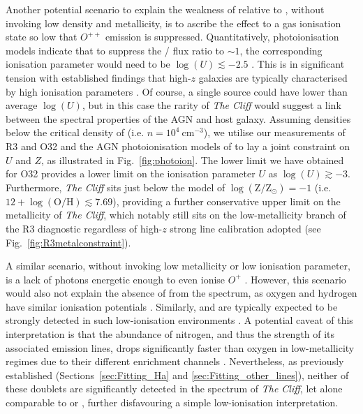 \documentclass[fleqn,usenatbib]{mnras}
\newcommand{\Hbeta}{\text{H\textbeta}\xspace}
\newcommand{\OIIall}{\forbiddenEL[O][ii][\textlambda][\textlambda][3727,][3729]}
\newcommand{\SIIall}{\forbiddenEL[S][ii][\textlambda][\textlambda][6716,][6731]}
\newcommand{\OIII}{\forbiddenEL[O][iii]}
\newcommand{\NIIall}{\forbiddenEL[N][ii][\textlambda][\textlambda][6548,][6583]}
\newcommand{\cliff}{\textit{The Cliff}\xspace}
\begin{document}
Another potential scenario to explain the weakness of \OIIIL relative to \Hbeta, without invoking low density and metallicity, is to ascribe the effect to a gas ionisation state so low that $O^{++}$ emission is suppressed. 
Quantitatively, photoionisation models indicate that to suppress the \OIII/\Hbeta flux ratio to $\sim1$, the corresponding ionisation parameter would need to be $\log(U)\lesssim-2.5$ \citep[e.g.][]{Nagao2006, BaronNetzer2019, Cameron2023}.
This is in significant tension with established findings that high-$z$ galaxies are typically characterised by high ionisation parameters \citep[$\log(U)\gtrsim -2.0$; e.g.][]{Cameron2023,Reddy2023, Tang2023}. 
Of course, a single source could have lower than average $\log(U)$, but in this case the rarity of \cliff would suggest a link between the spectral properties of the AGN and host galaxy.
Assuming densities below the critical density of \OIIall (i.e. $n = 10^4 \ \mathrm{cm}^{-3}$), we utilise our measurements of R3 and O32 and the AGN photoionisation models of \cite{Isobe2025} to lay a joint constraint on $U$ and $Z$, as illustrated in Fig.~\ref{fig:photoion}.
The lower limit we have obtained for O32 provides a lower limit on the ionisation parameter $U$ as $\log(U) \gtrsim -3$. 
Furthermore, \cliff sits just below the model of $\mathrm{\log(Z/Z_\odot)} = -1$ (i.e. $12+\log(\mathrm{O/H}) \lesssim 7.69$), providing a further conservative upper limit on the metallicity of \cliff, which notably still sits on the low-metallicity branch of the R3 diagnostic regardless of high-$z$ strong line calibration adopted (see Fig.~\ref{fig:R3metalconstraint}).

A similar scenario, without invoking low metallicity or low ionisation parameter, is a lack of photons energetic enough to even ionise $O^+$ \citep[$\sim35$ eV; see e.g.][]{Wenaker1990, Martin1993, Draine2011}. 
However, this scenario would also not explain the absence of \OIIall from the spectrum, as oxygen and hydrogen have similar ionisation potentials \citep{Osterbrock2006}. 
Similarly, \NIIall and \SIIall are typically expected to be strongly detected in such low-ionisation environments \citep{Rhea2025}.
A potential caveat of this interpretation is that the abundance of nitrogen, and thus the strength of its associated emission lines, drops significantly faster than oxygen in low-metallicity regimes due to their different enrichment channels \citep[][]{Nicholls2017}.
Nevertheless, as previously established (Sections~\ref{sec:Fitting_Ha} and \ref{sec:Fitting_other_lines}), neither of these doublets are significantly detected in the spectrum of \cliff, let alone comparable to \Hbeta or \OIIIL, further disfavouring a simple low-ionisation interpretation.
\end{document}
